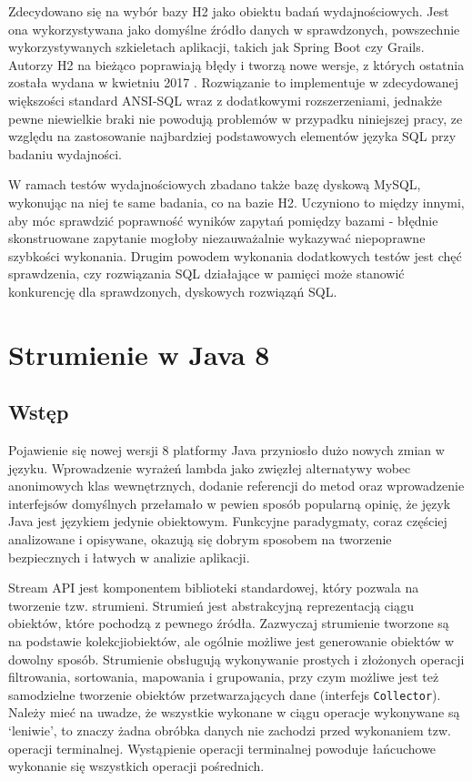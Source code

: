 \documentclass[12pt]{extarticle}
\begin{document}
    Zdecydowano się na wybór bazy H2 jako obiektu badań wydajnościowych. Jest ona wykorzystywana jako domyślne źródło danych w sprawdzonych, powszechnie wykorzystywanych szkieletach aplikacji, takich jak Spring Boot czy Grails. Autorzy H2 na bieżąco poprawiają błędy i tworzą nowe wersje, z których ostatnia została wydana w kwietniu 2017 \cite{h2maven}. Rozwiązanie to implementuje w zdecydowanej większości standard ANSI-SQL wraz z dodatkowymi rozszerzeniami, jednakże pewne niewielkie braki nie powodują problemów w przypadku niniejszej pracy, ze względu na zastosowanie najbardziej podstawowych elementów języka SQL przy badaniu wydajności.

    W ramach testów wydajnościowych zbadano także bazę dyskową MySQL, wykonując na niej te same badania, co na bazie H2. Uczyniono to między innymi, aby móc sprawdzić poprawność wyników zapytań pomiędzy bazami - błędnie skonstruowane zapytanie mogłoby niezauważalnie wykazywać niepoprawne szybkości wykonania. Drugim powodem wykonania dodatkowych testów jest chęć sprawdzenia, czy rozwiązania SQL działające w pamięci może stanowić konkurencję dla sprawdzonych, dyskowych rozwiąząń SQL.

\section{Strumienie w Java 8}

\subsection{Wstęp}

    Pojawienie się nowej wersji 8 platformy Java przyniosło dużo nowych zmian w języku. Wprowadzenie wyrażeń lambda jako zwięzłej alternatywy wobec anonimowych klas wewnętrznych, dodanie referencji do metod oraz wprowadzenie interfejsów domyślnych przełamało w pewien sposób popularną opinię, że język Java jest językiem jedynie obiektowym. Funkcyjne paradygmaty, coraz częściej analizowane i opisywane, okazują się dobrym sposobem na tworzenie bezpiecznych i łatwych w analizie aplikacji.

    Stream API jest komponentem biblioteki standardowej, który pozwala na tworzenie tzw. strumieni. Strumień jest abstrakcyjną reprezentacją ciągu obiektów, które pochodzą z pewnego źródła. Zazwyczaj strumienie tworzone są na podstawie kolekcjiobiektów, ale ogólnie możliwe jest generowanie obiektów w dowolny sposób. Strumienie obsługują wykonywanie prostych i złożonych operacji filtrowania, sortowania, mapowania i grupowania, przy czym możliwe jest też samodzielne tworzenie obiektów przetwarzających dane (interfejs \texttt{Collector}). Należy mieć na uwadze, że wszystkie wykonane w ciągu operacje wykonywane są `leniwie', to znaczy żadna obróbka danych nie zachodzi przed wykonaniem tzw. operacji terminalnej. Wystąpienie operacji terminalnej powoduje łańcuchowe wykonanie się wszystkich operacji pośrednich.
\end{document}
